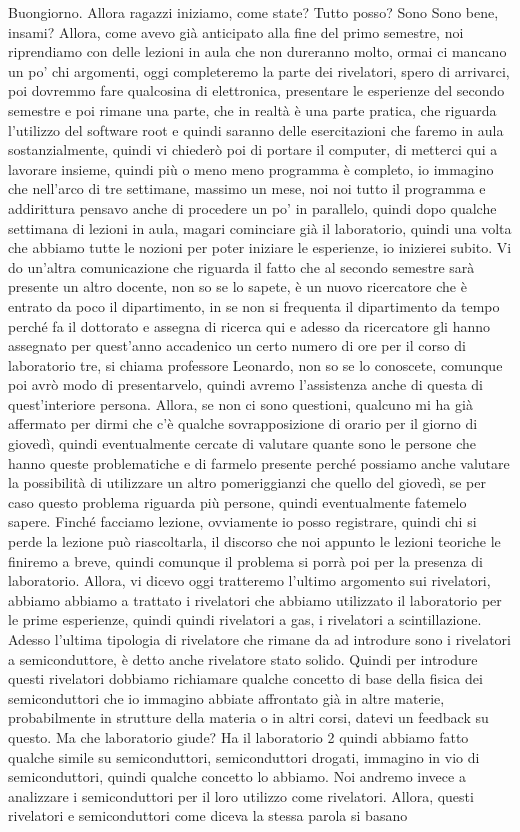 Buongiorno. Allora ragazzi iniziamo, come state? Tutto posso? Sono Sono bene, insami? Allora, come avevo già anticipato alla fine del primo semestre, noi riprendiamo con delle lezioni in aula che non dureranno molto, ormai ci mancano un po' chi argomenti, oggi completeremo la parte dei rivelatori, spero di arrivarci, poi dovremmo fare qualcosina di elettronica, presentare le esperienze del secondo semestre e poi rimane una parte, che in realtà è una parte pratica, che riguarda l'utilizzo del software root e quindi saranno delle esercitazioni che faremo in aula sostanzialmente, quindi vi chiederò poi di portare il computer, di metterci qui a lavorare insieme, quindi più o meno meno programma è completo, io immagino che nell'arco di tre settimane, massimo un mese, noi noi tutto il programma e addirittura pensavo anche di procedere un po' in parallelo, quindi dopo qualche settimana di lezioni in aula, magari cominciare già il laboratorio, quindi una volta che abbiamo tutte le nozioni per poter iniziare le esperienze, io inizierei subito. Vi do un'altra comunicazione che riguarda il fatto che al secondo semestre sarà presente un altro docente, non so se lo sapete, è un nuovo ricercatore che è entrato da poco il dipartimento, in se non si frequenta il dipartimento da tempo perché fa il dottorato e assegna di ricerca qui e adesso da ricercatore gli hanno assegnato per quest'anno accadenico un certo numero di ore per il corso di laboratorio tre, si chiama professore Leonardo, non so se lo conoscete, comunque poi avrò modo di presentarvelo, quindi avremo l'assistenza anche di questa di quest'interiore persona. Allora, se non ci sono questioni, qualcuno mi ha già affermato per dirmi che c'è qualche sovrapposizione di orario per il giorno di giovedì, quindi eventualmente cercate di valutare quante sono le persone che hanno queste problematiche e di farmelo presente perché possiamo anche valutare la possibilità di utilizzare un altro pomeriggianzi che quello del giovedì, se per caso questo problema riguarda più persone, quindi eventualmente fatemelo sapere. Finché facciamo lezione, ovviamente io posso registrare, quindi chi si perde la lezione può riascoltarla, il discorso che noi appunto le lezioni teoriche le finiremo a breve, quindi comunque il problema si porrà poi per la presenza di laboratorio. Allora, vi dicevo oggi tratteremo l'ultimo argomento sui rivelatori, abbiamo abbiamo a trattato i rivelatori che abbiamo utilizzato il laboratorio per le prime esperienze, quindi quindi rivelatori a gas, i rivelatori a scintillazione. Adesso l'ultima tipologia di rivelatore che rimane da ad introdure sono i rivelatori a semiconduttore, è detto anche rivelatore stato solido. Quindi per introdure questi rivelatori dobbiamo richiamare qualche concetto di base della fisica dei semiconduttori che io immagino abbiate affrontato già in altre materie, probabilmente in strutture della materia o in altri corsi, datevi un feedback su questo. Ma che laboratorio giude? Ha il laboratorio 2 quindi abbiamo fatto qualche simile su semiconduttori, semiconduttori drogati, immagino in vio di semiconduttori, quindi qualche concetto lo abbiamo. Noi andremo invece a analizzare i semiconduttori per il loro utilizzo come rivelatori. Allora, questi rivelatori e semiconduttori come diceva la stessa parola si basano 